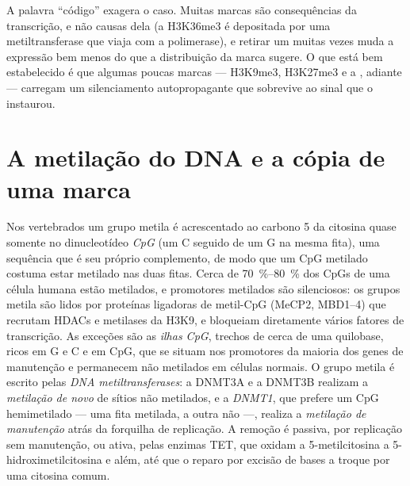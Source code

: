 \begin{remark}\label{rem:b3:chromatin-epigenetics:code}
A palavra ``código'' exagera o caso. Muitas marcas são consequências
da transcrição, e não causas dela (a H3K36me3 é depositada por uma
metiltransferase que viaja com a polimerase), e retirar um 
muitas vezes muda a expressão bem menos do que a distribuição da marca
sugere. O que está bem estabelecido é que algumas poucas marcas ---
H3K9me3, H3K27me3 e a , adiante --- carregam um
silenciamento autopropagante que sobrevive ao sinal que o instaurou.
\end{remark}

\section{A metilação do DNA e a cópia de uma marca}

\begin{definition}\label{def:b3:chromatin-epigenetics:methylation}
Nos vertebrados um grupo metila é acrescentado ao carbono 5 da
citosina quase somente no dinucleotídeo \emph{CpG} (um C seguido de um
G na mesma fita), uma sequência que é seu próprio complemento, de modo
que um CpG metilado costuma estar metilado nas duas fitas. Cerca de
\qtyrange{70}{80}{\%} dos CpGs de uma célula humana estão metilados, e
promotores metilados são silenciosos: os grupos metila são lidos por
proteínas ligadoras de metil-CpG (MeCP2, MBD1--4) que recrutam HDACs e
metilases da H3K9, e bloqueiam diretamente vários fatores de
transcrição. As exceções são as \emph{ilhas CpG}, trechos de cerca de
uma quilobase, ricos em G e C e em CpG, que se situam nos promotores
da maioria dos genes de manutenção e permanecem não metilados em
células normais. O grupo metila é escrito pelas \emph{DNA
metiltransferases}: a DNMT3A e a DNMT3B realizam a \emph{metilação de
novo} de sítios não metilados, e a \emph{DNMT1}, que prefere um CpG
hemimetilado --- uma fita metilada, a outra não ---, realiza a
\emph{metilação de manutenção} atrás da forquilha de replicação. A
remoção é passiva, por replicação sem manutenção, ou ativa, pelas
enzimas TET, que oxidam a 5-metilcitosina a 5-hidroximetilcitosina e
além, até que o reparo por excisão de bases a troque por uma citosina
comum.
\end{definition}

